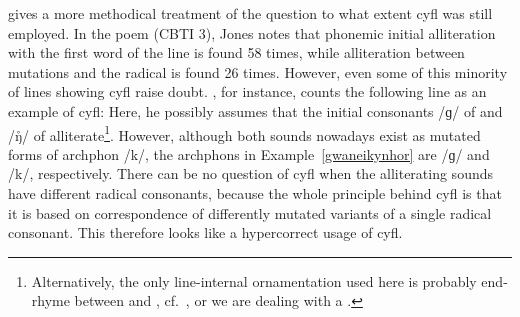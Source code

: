 \Textcite{jones_meddwl_2005} gives a more methodical treatment of the question to what extent \gls{cyfl} was still employed. In the poem  (\acrshort{CBTI} 3), Jones notes that phonemic initial alliteration with the first word of the line is found 58 times, while alliteration between mutations and the radical is found 26 times. 
However, even some of this minority of lines showing  \gls{cyfl} raise doubt. \Textcite[162]{jones_meddwl_2005}, for instance, counts the following line as an example of \gls{cyfl}:
Here, he possibly assumes that the initial consonants /ɡ/ of  and /ŋ̊/ of  alliterate\footnote{Alternatively, the only line-internal ornamentation used here is probably end-rhyme between  and , cf.\ \textcite[xlvii]{andrews_welsh_2007}, or we are dealing with a .}. However, although both sounds nowadays exist as mutated forms of \gls{archphon} /k/, the \gls{archphon}s in Example~\ref{gwaneikynhor}  are /ɡ/ and /k/, respectively. There can be no question of \gls{cyfl} when the alliterating sounds have different radical consonants, because the whole principle behind \gls{cyfl} is that it is based on correspondence of differently mutated variants of a single radical consonant.  This therefore looks like a hypercorrect usage of \gls{cyfl}. 


